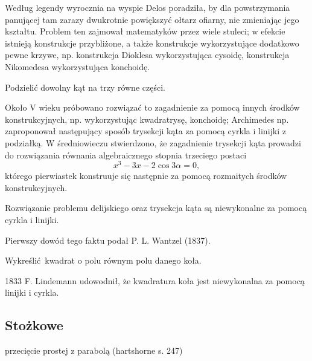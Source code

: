 Według legendy wyrocznia na wyspie Delos poradziła, by dla powstrzymania panującej tam zarazy dwukrotnie powiększyć ołtarz ofiarny, nie zmieniając jego kształtu.
Problem ten zajmował matematyków przez wiele stuleci; w efekcie istnieją konstrukcje przybliżone, a także konstrukcje wykorzystujące dodatkowo pewne krzywe, np. konstrukcja Dioklesa wykorzystująca cysoidę, konstrukcja Nikomedesa wykorzystująca konchoidę.

\begin{problem}
    Podzielić dowolny kąt na trzy równe części.
\end{problem}

Około V wieku próbowano rozwiązać to zagadnienie za pomocą innych środków konstrukcyjnych, np. wykorzystując kwadratrysę, konchoidę; Archimedes np. zaproponował następujący sposób trysekcji kąta za pomocą cyrkla i linijki z podziałką.
W średniowieczu stwierdzono, że zagadnienie trysekcji kąta prowadzi do rozwiązania równania algebraicznego stopnia trzeciego postaci
\begin{equation}
    x^3 - 3 x - 2 \cos 3\alpha = 0,
\end{equation}
którego pierwiastek konstruuje się następnie za pomocą rozmaitych środków konstrukcyjnych.

\begin{proposition}
    Rozwiązanie problemu delijskiego oraz trysekcja kąta są niewykonalne za pomocą cyrkla i linijki.
\end{proposition}

Pierwszy dowód tego faktu podał P. L. Wantzel (1837).

\begin{problem}
    Wykreślić kwadrat o polu równym polu danego koła.
\end{problem}

1833 F. Lindemann udowodnił, że kwadratura koła jest niewykonalna za pomocą linijki i cyrkla.

\subsection{Stożkowe}
przecięcie prostej z parabolą (hartshorne s. 247)

